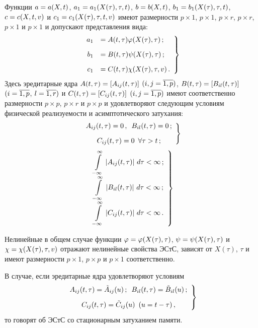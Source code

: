\begin{multicols}{2}
Функции $a\hm=a(X, t)$, $a_1 \hm= a_1(X (\tau),\tau, t)$, $b\hm=b(X, t)$, 
$b_1 \hm= b_1(X (\tau),\tau, t)$, $c\hm=c(X,t,v)$ и $c_1\hm = c_1(X (\tau),\tau, t,v)$ 
имеют размерности $p\times 1$, $p\times 1$, $p\times r$, $p\times r$, 
$p\times 1$ и $p\times 1$ и допускают представления вида:
\begin{equation}
\left.
\begin{array}{rl}
    a_1&=A(t,\tau) \varphi (X(\tau), \tau)\,;\\[9pt] 
    b_1&=B(t,\tau) \psi (X(\tau) ,  \tau)\,;\\[9pt]
    c_1&=C(t,\tau) \chi (X(\tau) ,  \tau, v)\,.
    \end{array}
    \right\}
    \label{e2.2-s}
    \end{equation}
Здесь эредитарные ядра $A(t,\tau)\hm=\lk A_{ij}(t,\tau)\rk$ $(i,j\hm=\overline{1,p})$,
$B(t,\tau)\hm=\lk B_{i l}(t,\tau)\rk$ $(i\hm=\overline{1,p}$, $l\hm=\overline{1,r})$ и
$C(t,\tau)\hm=\lk C_{ij}(t,\tau)\rk$ $(i,j\hm=\overline{1,p})$ имеют соответственно 
размерности
$p\times p$, $p\times r$ и $p\times p$ и удовлетворяют следующим условиям 
физической реализуемости и асимптотического затухания:
\begin{equation}
\left.
\begin{array}{c}
A_{ij}(t,\tau)=0\,,\enskip B_{i l}(t,\tau)=0\,;\\[9pt] 
C_{ij}(t,\tau)=0\enskip \forall \tau >t\,;
\end{array}
\right\}\label{e2.3-s}
\end{equation}
\begin{equation}
\left.
\begin{array}{c}
\displaystyle\int\limits_{-\infty}^\infty \,\left\vert A_{ij} (t,\tau) \right\vert\, d\tau <\infty \,;\\[9pt]
\displaystyle\int\limits_{-\infty}^\infty \,\left\vert B_{i l} (t,\tau) \right\vert\, d\tau <\infty \,;\\[9pt] 
\displaystyle\int\limits_{-\infty}^\infty \,\left\vert C_{ij} (t,\tau) \right\vert\, d\tau <\infty\,.
\end{array}
\right\}\label{e2.4-s}
\end{equation}

Нелинейные в общем случае функции $\vrp\hm=\vrp(X(\tau),\tau)$,
$\psi \hm=\psi(X(\tau), \tau)$ и $\chi \hm=\chi (X(\tau),  \tau, v)$ 
отражают нелинейные свойства ЭСтС, зависят от $X(\tau)$, $\tau$ и имеют размерности 
$p\times 1$, $p\times p$ и $p\times 1$ соответственно.

В случае, если эредитарные ядра удовлетворяют условиям
\begin{equation}
\left.
\begin{array}{c}
A_{ij} (t,\tau) =\tilde A_{ij} (u)\,;\enskip 
B_{i l} (t,\tau) =\tilde B_{i l} (u)\,;\\[9pt]  
C_{ij} (t,\tau) =\tilde C_{ij} (u)\enskip (u=t-\tau)\,,
\label{e2.5-s}
\end{array}
\right\}
\end{equation}
то говорят об ЭСтС со стационарным затуханием памяти.


\end{multicols}
